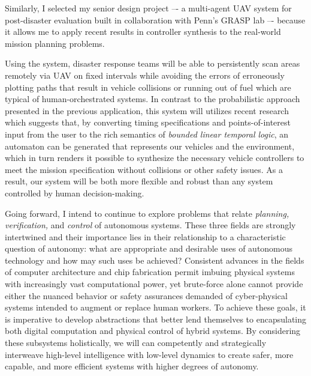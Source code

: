 \documentclass[11pt]{letter}
\begin{document}
Similarly, I selected my senior design project –- a multi-agent UAV system for post-disaster evaluation built in collaboration with Penn's GRASP lab –- because it allows me to apply recent results in controller synthesis to the real-world mission planning problems.  

Using the system, disaster response teams will be able to persistently scan areas remotely via UAV on fixed intervals while avoiding the errors of erroneously plotting paths that result in vehicle collisions or running out of fuel which are typical of human-orchestrated systems. In contrast to the probabilistic approach presented in the previous application, this system will utilizes recent research which suggests that, by converting timing specifications and points-of-interest input from the user to the rich semantics of \emph{bounded linear temporal logic}, an automaton can be generated that represents our vehicles and the environment, which in turn renders it possible to synthesize the necessary vehicle controllers to meet the mission specification without collisions or other safety issues.  As a result, our system will be both more flexible and robust than any system controlled by human decision-making.

Going forward, I intend to continue to explore problems that relate \emph{planning, verification,} and \emph{control} of autonomous systems.  These three fields are strongly intertwined and their importance lies in their relationship to a characteristic question of autonomy:  what are appropriate and desirable uses of autonomous technology and how may such uses be achieved? Consistent advances in the fields of computer architecture and chip fabrication permit imbuing physical systems with increasingly vast computational power, yet brute-force alone cannot provide either the nuanced behavior or safety assurances demanded of cyber-physical systems intended to augment or replace human workers. To achieve these goals, it is imperative to develop abstractions that better lend themselves to encapsulating both digital computation and physical control of hybrid systems. By considering these subsystems holistically, we will can competently and strategically interweave high-level intelligence with low-level dynamics to create safer, more capable, and more efficient systems with higher degrees of autonomy.  
\end{document}
